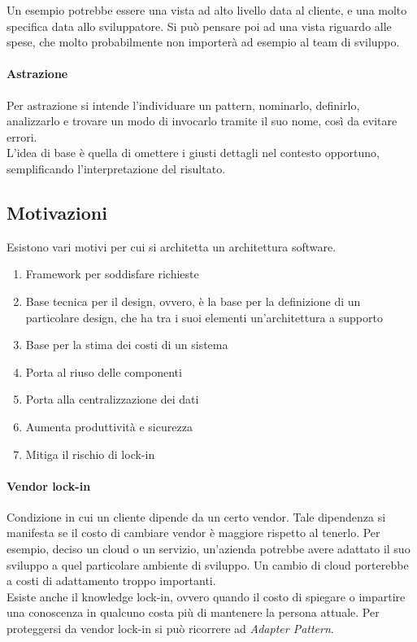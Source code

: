 \documentclass[a4paper]{article}
\begin{document}
Un esempio potrebbe essere una vista ad alto livello data al cliente, e una molto specifica 
data allo sviluppatore.
Si può pensare poi ad una vista riguardo alle spese, che molto probabilmente non importerà 
ad esempio al team di sviluppo. 

\paragraph{Astrazione}
Per astrazione si intende l'individuare un pattern, nominarlo, definirlo, 
analizzarlo e trovare un modo di invocarlo tramite il suo nome, così da evitare
errori.\\
L'idea di base è quella di omettere i giusti dettagli nel contesto opportuno, 
semplificando l'interpretazione del risultato.

\subsection{Motivazioni}

Esistono vari motivi per cui si architetta un architettura software.
\begin{enumerate}
    \item Framework per soddisfare richieste
    \item Base tecnica per il design, ovvero, è la base per la definizione di un
     particolare design, che ha tra i suoi elementi un'architettura a supporto
    \item Base per la stima dei costi di un sistema
    \item Porta al riuso delle componenti
    \item Porta alla centralizzazione dei dati
    \item Aumenta produttività e sicurezza
    \item Mitiga il rischio di lock-in
\end{enumerate}

\paragraph{Vendor lock-in}
Condizione in cui un cliente dipende da un certo vendor.
Tale dipendenza si manifesta se il costo di cambiare vendor è maggiore rispetto al 
tenerlo. Per esempio, deciso un cloud o un servizio, un'azienda potrebbe avere 
adattato il suo sviluppo a quel particolare ambiente di sviluppo. Un cambio di 
cloud porterebbe a costi di adattamento troppo importanti.\\
Esiste anche il knowledge lock-in, ovvero quando il costo di spiegare o impartire 
una conoscenza in qualcuno costa più di mantenere la persona attuale.
Per proteggersi da vendor lock-in si può ricorrere ad \emph{Adapter Pattern}.
\end{document}

